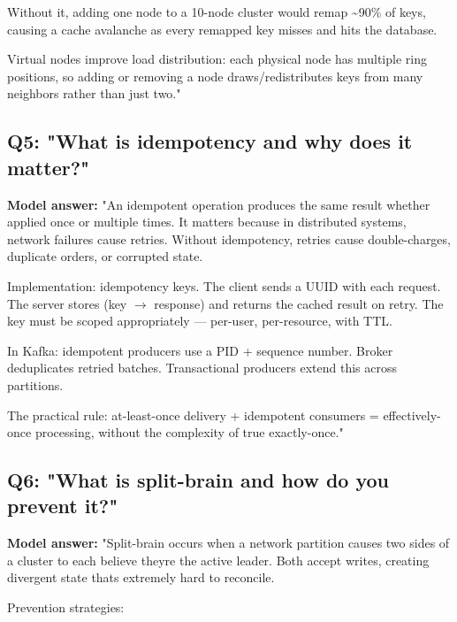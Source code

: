 \documentclass[11pt]{article}
\begin{document}
Without it, adding one node to a 10-node cluster would remap \textasciitilde90\% of keys, causing a cache avalanche as every remapped key misses and hits the database.

Virtual nodes improve load distribution: each physical node has multiple ring positions, so adding or removing a node draws/redistributes keys from many neighbors rather than just two."

\subsection{Q5: "What is idempotency and why does it matter?"}\label{q5-what-is-idempotency-and-why-does-it-matter}

\textbf{Model answer:}
"An idempotent operation produces the same result whether applied once or multiple times. It matters because in distributed systems, network failures cause retries. Without idempotency, retries cause double-charges, duplicate orders, or corrupted state.

Implementation: idempotency keys. The client sends a UUID with each request. The server stores (key \(\rightarrow\) response) and returns the cached result on retry. The key must be scoped appropriately --- per-user, per-resource, with TTL.

In Kafka: idempotent producers use a PID + sequence number. Broker deduplicates retried batches. Transactional producers extend this across partitions.

The practical rule: at-least-once delivery + idempotent consumers = effectively-once processing, without the complexity of true exactly-once."

\subsection{Q6: "What is split-brain and how do you prevent it?"}\label{q6-what-is-split-brain-and-how-do-you-prevent-it}

\textbf{Model answer:}
"Split-brain occurs when a network partition causes two sides of a cluster to each believe they\textquotesingle re the active leader. Both accept writes, creating divergent state that\textquotesingle s extremely hard to reconcile.

Prevention strategies:
\end{document}
